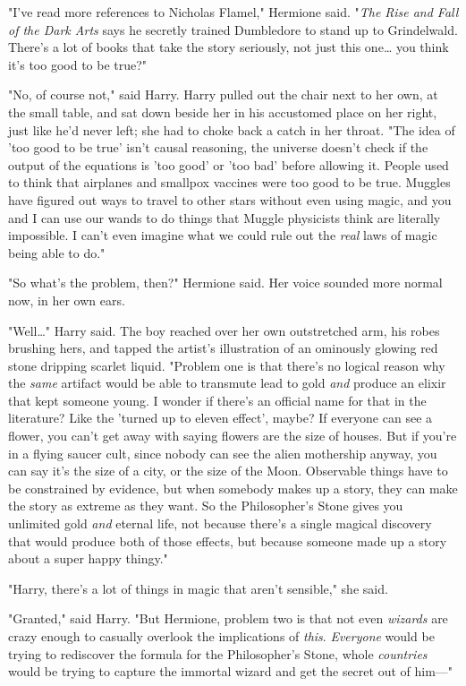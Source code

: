 "I've read more references to Nicholas Flamel," Hermione said. "\emph{The Rise 
and Fall of the Dark Arts} says he secretly trained Dumbledore to stand up to 
Grindelwald. There's a lot of books that take the story seriously, not just 
this one{\ldots} you think it's too good to be true?"

"No, of course not," said Harry. Harry pulled out the chair next to her own, at 
the small table, and sat down beside her in his accustomed place on her right, 
just like he'd never left; she had to choke back a catch in her throat. "The 
idea of 'too good to be true' isn't causal reasoning, the universe doesn't 
check if the output of the equations is 'too good' or 'too bad' before allowing 
it. People used to think that airplanes and smallpox vaccines were too good to 
be true. Muggles have figured out ways to travel to other stars without even 
using magic, and you and I can use our wands to do things that Muggle 
physicists think are literally impossible. I can't even imagine what we could 
rule out the \emph{real} laws of magic being able to do."

"So what's the problem, then?" Hermione said. Her voice sounded more normal 
now, in her own ears.

"Well{\ldots}" Harry said. The boy reached over her own outstretched arm, his 
robes brushing hers, and tapped the artist's illustration of an ominously 
glowing red stone dripping scarlet liquid. "Problem one is that there's no 
logical reason why the \emph{same} artifact would be able to transmute lead to 
gold \emph{and} produce an elixir that kept someone young. I wonder if there's 
an official name for that in the literature? Like the 'turned up to eleven 
effect', maybe? If everyone can see a flower, you can't get away with saying 
flowers are the size of houses. But if you're in a flying saucer cult, since 
nobody can see the alien mothership anyway, you can say it's the size of a 
city, or the size of the Moon. Observable things have to be constrained by 
evidence, but when somebody makes up a story, they can make the story as 
extreme as they want. So the Philosopher's Stone gives you unlimited gold 
\emph{and} eternal life, not because there's a single magical discovery that 
would produce both of those effects, but because someone made up a story about 
a super happy thingy."

"Harry, there's a lot of things in magic that aren't sensible," she said.

"Granted," said Harry. "But Hermione, problem two is that not even 
\emph{wizards} are crazy enough to casually overlook the implications of 
\emph{this}. \emph{Everyone} would be trying to rediscover the formula for the 
Philosopher's Stone, whole \emph{countries} would be trying to capture the 
immortal wizard and get the secret out of him---"

